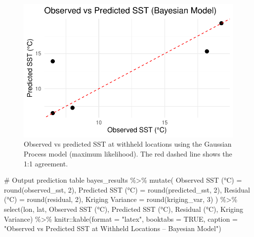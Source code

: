 \documentclass[
  11pt,
]{article}
\newenvironment{Shaded}{\begin{snugshade}}{\end{snugshade}}
\newcommand{\AttributeTok}[1]{\textcolor[rgb]{0.40,0.45,0.13}{#1}}
\newcommand{\CommentTok}[1]{\textcolor[rgb]{0.37,0.37,0.37}{#1}}
\newcommand{\ConstantTok}[1]{\textcolor[rgb]{0.56,0.35,0.01}{#1}}
\newcommand{\DecValTok}[1]{\textcolor[rgb]{0.68,0.00,0.00}{#1}}
\newcommand{\FunctionTok}[1]{\textcolor[rgb]{0.28,0.35,0.67}{#1}}
\newcommand{\NormalTok}[1]{\textcolor[rgb]{0.00,0.23,0.31}{#1}}
\newcommand{\OtherTok}[1]{\textcolor[rgb]{0.00,0.23,0.31}{#1}}
\newcommand{\SpecialCharTok}[1]{\textcolor[rgb]{0.37,0.37,0.37}{#1}}
\newcommand{\StringTok}[1]{\textcolor[rgb]{0.13,0.47,0.30}{#1}}
\begin{document}
\begin{figure}[H]

{\centering \includegraphics{project_files/figure-pdf/fig-bayes_pred_scatter-1.pdf}

}

\caption{Observed vs predicted SST at withheld locations using the
Gaussian Process model (maximum likelihood). The red dashed line shows
the 1:1 agreement.}

\end{figure}%

\begin{Shaded}
\begin{Highlighting}[]
\CommentTok{\# Output prediction table}
\NormalTok{bayes\_results }\SpecialCharTok{\%\textgreater{}\%}
  \FunctionTok{mutate}\NormalTok{(}
    \StringTok{\textasciigrave{}}\AttributeTok{Observed SST (°C)}\StringTok{\textasciigrave{}} \OtherTok{=} \FunctionTok{round}\NormalTok{(observed\_sst, }\DecValTok{2}\NormalTok{),}
    \StringTok{\textasciigrave{}}\AttributeTok{Predicted SST (°C)}\StringTok{\textasciigrave{}} \OtherTok{=} \FunctionTok{round}\NormalTok{(predicted\_sst, }\DecValTok{2}\NormalTok{),}
    \StringTok{\textasciigrave{}}\AttributeTok{Residual (°C)}\StringTok{\textasciigrave{}} \OtherTok{=} \FunctionTok{round}\NormalTok{(residual, }\DecValTok{2}\NormalTok{),}
    \StringTok{\textasciigrave{}}\AttributeTok{Kriging Variance}\StringTok{\textasciigrave{}} \OtherTok{=} \FunctionTok{round}\NormalTok{(kriging\_var, }\DecValTok{3}\NormalTok{)}
\NormalTok{  ) }\SpecialCharTok{\%\textgreater{}\%}
  \FunctionTok{select}\NormalTok{(lon, lat, }\StringTok{\textasciigrave{}}\AttributeTok{Observed SST (°C)}\StringTok{\textasciigrave{}}\NormalTok{, }\StringTok{\textasciigrave{}}\AttributeTok{Predicted SST (°C)}\StringTok{\textasciigrave{}}\NormalTok{, }\StringTok{\textasciigrave{}}\AttributeTok{Residual (°C)}\StringTok{\textasciigrave{}}\NormalTok{,}
         \StringTok{\textasciigrave{}}\AttributeTok{Kriging Variance}\StringTok{\textasciigrave{}}\NormalTok{) }\SpecialCharTok{\%\textgreater{}\%}
\NormalTok{  knitr}\SpecialCharTok{::}\FunctionTok{kable}\NormalTok{(}\AttributeTok{format =} \StringTok{"latex"}\NormalTok{, }\AttributeTok{booktabs =} \ConstantTok{TRUE}\NormalTok{,}
               \AttributeTok{caption =} \StringTok{"Observed vs Predicted SST at Withheld Locations – }
\StringTok{               Bayesian Model"}\NormalTok{)}
\end{Highlighting}
\end{Shaded}
\end{document}
